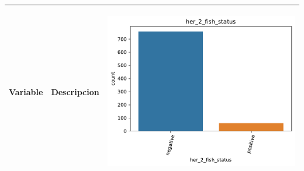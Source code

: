 \begin{table}[!htb]
\begin{threeparttable}
\begin{tabular}{p{2.5cm} p{7cm} p{6.5cm}}
			Variable
			& Descripcion
			& \begin{center}\includegraphics[width=1\linewidth]{NOTEBOOK/IMAGENES_DESCRIPTIVAS/19_her_2_fish_status}\end{center}
			\\ \hline
		\end{tabular}
	\end{threeparttable}
\end{table}







